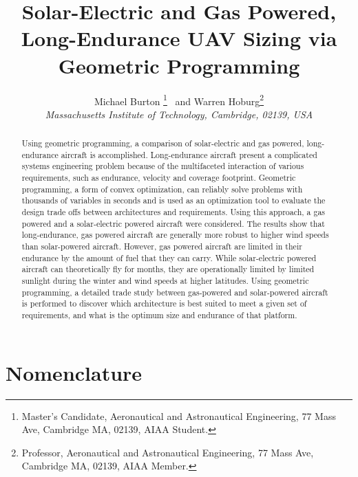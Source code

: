 \documentclass[]{aiaa-tc}%
\title{Solar-Electric and Gas Powered, Long-Endurance UAV Sizing via Geometric Programming}
\author{
  Michael Burton \thanks{Master's Candidate, Aeronautical and Astronautical Engineering, 77 Mass Ave, Cambridge MA, 02139, AIAA Student.}
  \ and Warren Hoburg\thanks{Professor, Aeronautical and Astronautical Engineering, 77 Mass Ave, Cambridge MA, 02139, AIAA Member.}\\
  {\normalsize\itshape
   Massachusetts Institute of Technology, Cambridge, 02139, USA}\\
 }
\begin{document}
\maketitle

\begin{abstract}
    Using geometric programming, a comparison of solar-electric and gas powered, long-endurance aircraft is accomplished.
    Long-endurance aircraft present a complicated systems engineering problem because of the multifaceted interaction of various requirements, such as endurance, velocity and coverage footprint.
    Geometric programming, a form of convex optimization, can reliably solve problems with thousands of variables in seconds and is used as an optimization tool to evaluate the design trade offs between architectures and requirements.
    Using this approach, a gas powered and a solar-electric powered aircraft were considered.  
    The results show that long-endurance, gas powered aircraft are generally more robust to higher wind speeds than solar-powered aircraft.  
    However, gas powered aircraft are limited in their endurance by the amount of fuel that they can carry. 
    While solar-electric powered aircraft can theoretically fly for months, they are operationally limited by limited sunlight during the winter and wind speeds at higher latitudes.
    Using geometric programming, a detailed trade study between gas-powered and solar-powered aircraft is performed to discover which architecture is best suited to meet a given set of requirements, and what is the optimum size and endurance of that platform.
\end{abstract}

\section*{Nomenclature}
\end{document}
